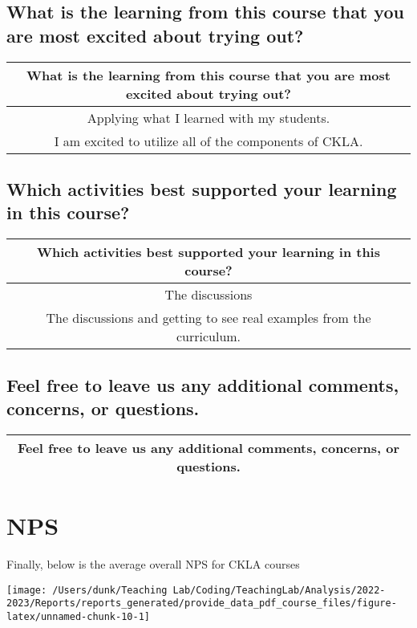 \documentclass[10,a4paperpaper,]{article}
\begin{document}
\subsection{What is the learning from this course that you are most excited about trying out?}

\captionsetup[table]{labelformat=empty,skip=1pt}
\begin{longtable}{c}
\toprule
What is the learning from this course that you are most excited about trying out? \\ 
\midrule
Applying what I learned with my students. \\ 
I am excited to utilize all of the components of CKLA. \\ 
\bottomrule
\end{longtable}

\subsection{Which activities best supported your learning in this course?}

\captionsetup[table]{labelformat=empty,skip=1pt}
\begin{longtable}{c}
\toprule
Which activities best supported your learning in this course? \\ 
\midrule
The discussions \\ 
The discussions and getting to see real examples from the curriculum. \\ 
\bottomrule
\end{longtable}

\subsection{Feel free to leave us any additional comments, concerns, or questions.}

\captionsetup[table]{labelformat=empty,skip=1pt}
\begin{longtable}{c}
\toprule
Feel free to leave us any additional comments, concerns, or questions. \\ 
\midrule
\bottomrule
\end{longtable}

\section{NPS}

Finally, below is the average overall NPS for CKLA courses

\begin{center}\texttt{[image: /Users/dunk/Teaching Lab/Coding/TeachingLab/Analysis/2022-2023/Reports/reports\_generated/provide\_data\_pdf\_course\_files/figure-latex/unnamed-chunk-10-1]} \end{center}
\end{document}
